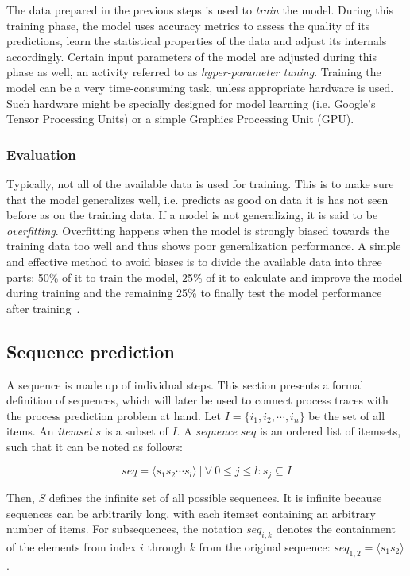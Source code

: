 The data prepared in the previous steps is used to \textit{train} the model. During this training phase, the model uses accuracy metrics to assess the quality of its predictions, learn the statistical properties of the data and adjust its internals accordingly. Certain input parameters of the model are adjusted during this phase as well, an activity referred to as \textit{hyper-parameter tuning}. Training the model can be a very time-consuming task, unless appropriate hardware is used. Such hardware might be specially designed for model learning (i.e. Google's Tensor Processing Units) or a simple Graphics Processing Unit (GPU).

\subsubsection*{Evaluation}
Typically, not all of the available data is used for training. This is to make sure that the model generalizes well, i.e. predicts as good on data it is has not seen before as on the training data. If a model is not generalizing, it is said to be \textit{overfitting}. Overfitting happens when the model is strongly biased towards the training data too well and thus shows poor generalization performance. A simple and effective method to avoid biases is to divide the available data into three parts: 50\% of it to train the model, 25\% of it to calculate and improve the model during training and the remaining 25\% to finally test the model performance after training~\cite{kuhn2013applied, trevor2009elements}.

\subsection{Sequence prediction}\label{sec:background:sequence-prediction}
A sequence is made up of individual steps. This section presents a formal definition of sequences, which will later be used to connect process traces with the process prediction problem at hand. Let $I = \{i_1, i_2, \cdots, i_n\}$ be the set of all items. An \textit{itemset} $s$ is a subset of $I$. A \textit{sequence} $seq$ is an ordered list of itemsets, such that it can be noted as follows:

$$seq = \langle s_1s_2\cdots s_l \rangle\ |\ \forall\ 0 \leq j \leq l: s_j \subseteq I$$

Then, $S$ defines the infinite set of all possible sequences. It is infinite because sequences can be arbitrarily long, with each itemset containing an arbitrary number of items. For  subsequences, the notation $seq_{i,k}$ denotes the containment of the elements from index $i$ through $k$ from the original sequence: $seq_{1,2} = \langle s_1s_2 \rangle$.\\

